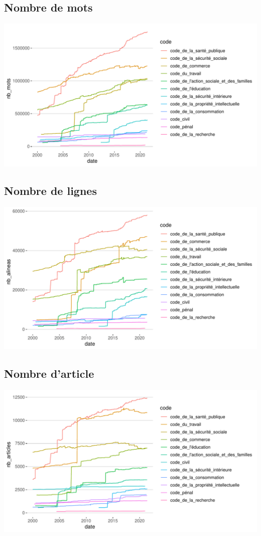 \documentclass[
  oneside]{book}
\begin{document}
\hypertarget{nombre-de-mots}{%
\subsection{Nombre de mots}\label{nombre-de-mots}}

\includegraphics{05-images_files/figure-latex/nb_mots-1.pdf}

\hypertarget{nombre-de-lignes}{%
\subsection{Nombre de lignes}\label{nombre-de-lignes}}

\includegraphics{05-images_files/figure-latex/nb_alineas-1.pdf}

\hypertarget{nombre-darticle}{%
\subsection{Nombre d'article}\label{nombre-darticle}}

\includegraphics{05-images_files/figure-latex/nb_articles-1.pdf}
\end{document}

